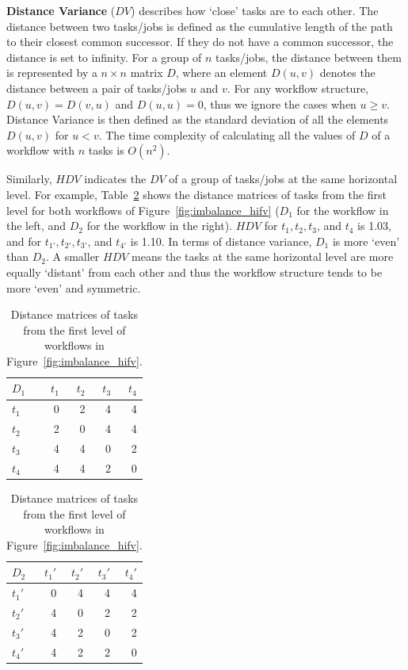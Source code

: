 \textbf{Distance Variance} ($DV$) describes how `close' tasks are to each other. The distance between two tasks/jobs is defined as the cumulative length of the path to their closest common successor. If they do not have a common successor, the distance is set to infinity. For a group of $n$ tasks/jobs, the distance between them is represented by a $n \times n$ matrix $D$, where an element $D(u,v)$ denotes the distance between a pair of tasks/jobs $u$ and $v$. For any workflow structure, $D(u,v)=D(v,u)$ and $D(u,u)=0$, thus we ignore the cases when $u \geq v$. Distance Variance is then defined as the standard deviation of all the elements $D(u,v)$ for $u<v$. The time complexity of calculating all the values of $D$ of a workflow with $n$ tasks is $O(n^2)$. 

Similarly, $HDV$ indicates the $DV$ of a group of tasks/jobs at the same horizontal level. For example, Table~\ref{tab:imblance_metric} shows the distance matrices of tasks from the first level for both workflows of Figure~\ref{fig:imbalance_hifv} ($D_1$ for the workflow in the left, and $D_2$ for the workflow in the right). $HDV$ for $t_1, t_2, t_3$, and $t_4$ is 1.03, and for $t_{1'}, t_{2'}, t_{3'}$, and $t_{4'}$ is 1.10. In terms of distance variance, $D_1$ is more `even' than $D_2$. A smaller $HDV$ means the tasks at the same horizontal level are more equally `distant' from each other and thus the workflow structure tends to be more `even' and symmetric. 

\begin{table}[htb]
	\footnotesize
	\centering
	\begin{tabular}{l|rrrr}
		$D_1$ & $t_1$ & $t_2$ & $t_3$ &$t_4$\\
		\hline
		$t_1$ & 0 & 2 & 4 & 4 \\
		$t_2$ & 2 & 0 & 4 & 4 \\
		$t_3$ & 4 & 4 & 0 & 2\\
		$t_4$ & 4 & 4 & 2 & 0 \\
	\end{tabular}
	\quad
	\begin{tabular}{l|rrrr}
		$D_2$ & $t_1'$ & $t_2'$ & $t_3'$ &$t_4'$\\
		\hline
		$t_1'$ & 0 & 4 & 4 & 4 \\
		$t_2'$ & 4 & 0 & 2 & 2 \\
		$t_3'$ & 4 & 2 & 0 & 2\\
		$t_4'$ & 4 & 2 & 2 & 0 \\
	\end{tabular}
	\caption{Distance matrices of tasks from the first level of workflows in Figure~\ref{fig:imbalance_hifv}.}
	\label{tab:imblance_metric}
\end{table}


